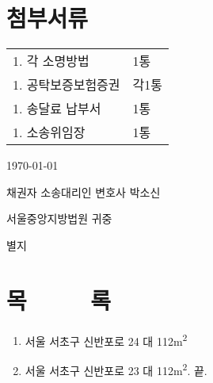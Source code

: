 \documentclass[12pt]{oblivoir}
\begin{document}
\chapter*{\normalfont\normalsize 첨부서류}
\begin{longtabu}to \linewidth{X X}
  1. 각 소명방법&1통\\
  1. 공탁보증보험증권&각1통\\
  1. 송달료 납부서&1통\\
  1. 소송위임장&1통
\end{longtabu}
\vspace{5em}
\centering\today{}\par
{}
\raggedleft 채권자 소송대리인 변호사 박소신\\
\raggedright 서울중앙지방법원 귀중





\newpage
{} %
별지
\vspace{5em}
\chapter*{\normalfont\normalsize 목~~~~~록}
\begin{enumerate}
\item 서울 서초구 신반포로 24 대 112\si{\square\metre}\\
\item 서울 서초구 신반포로 23 대 112\si{\square\metre}. 끝.\\
\end{enumerate}
\end{document}
